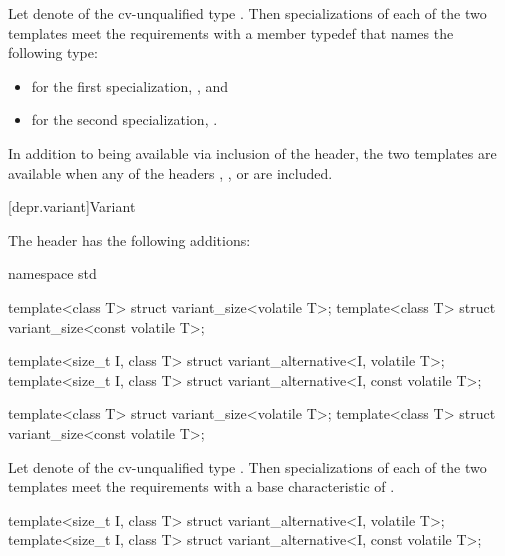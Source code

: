 \begin{itemdescr}
\pnum
Let  denote 
of the cv-unqualified type .
Then specializations of each of the two templates meet
the  requirements
with a member typedef  that names the following type:
\begin{itemize}
\item for the first specialization, , and
\item for the second specialization, .
\end{itemize}

\pnum
In addition to being available via inclusion of the  header,
the two templates are available when any of the headers
,
, or
are included.
\end{itemdescr}

[depr.variant]{Variant}

\pnum
The header  has the following additions:

\begin{codeblock}
namespace std {
  template<class T> struct variant_size<volatile T>;
  template<class T> struct variant_size<const volatile T>;

  template<size_t I, class T> struct variant_alternative<I, volatile T>;
  template<size_t I, class T> struct variant_alternative<I, const volatile T>;
}
\end{codeblock}

\begin{itemdecl}
template<class T> struct variant_size<volatile T>;
template<class T> struct variant_size<const volatile T>;
\end{itemdecl}

\begin{itemdescr}
\pnum
Let  denote 
of the cv-unqualified type .
Then specializations of each of the two templates meet
the  requirements
with a base characteristic of .
\end{itemdescr}

\begin{itemdecl}
template<size_t I, class T> struct variant_alternative<I, volatile T>;
template<size_t I, class T> struct variant_alternative<I, const volatile T>;
\end{itemdecl}

